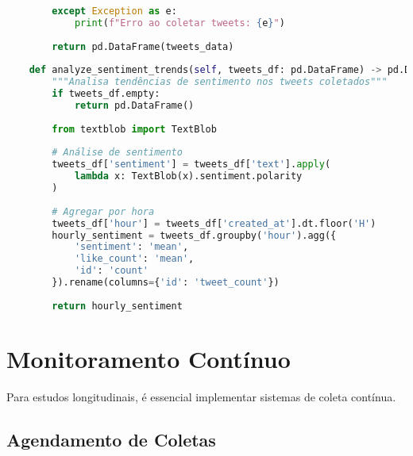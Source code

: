\begin{pythonbox}
\begin{lstlisting}[language=Python]
                
        except Exception as e:
            print(f"Erro ao coletar tweets: {e}")
            
        return pd.DataFrame(tweets_data)
    
    def analyze_sentiment_trends(self, tweets_df: pd.DataFrame) -> pd.DataFrame:
        """Analisa tendências de sentimento nos tweets coletados"""
        if tweets_df.empty:
            return pd.DataFrame()
        
        from textblob import TextBlob
        
        # Análise de sentimento
        tweets_df['sentiment'] = tweets_df['text'].apply(
            lambda x: TextBlob(x).sentiment.polarity
        )
        
        # Agregar por hora
        tweets_df['hour'] = tweets_df['created_at'].dt.floor('H')
        hourly_sentiment = tweets_df.groupby('hour').agg({
            'sentiment': 'mean',
            'like_count': 'mean',
            'id': 'count'
        }).rename(columns={'id': 'tweet_count'})
        
        return hourly_sentiment
\end{lstlisting}
\end{pythonbox}

\section{Monitoramento Contínuo}

Para estudos longitudinais, é essencial implementar sistemas de coleta contínua.

\subsection{Agendamento de Coletas}

